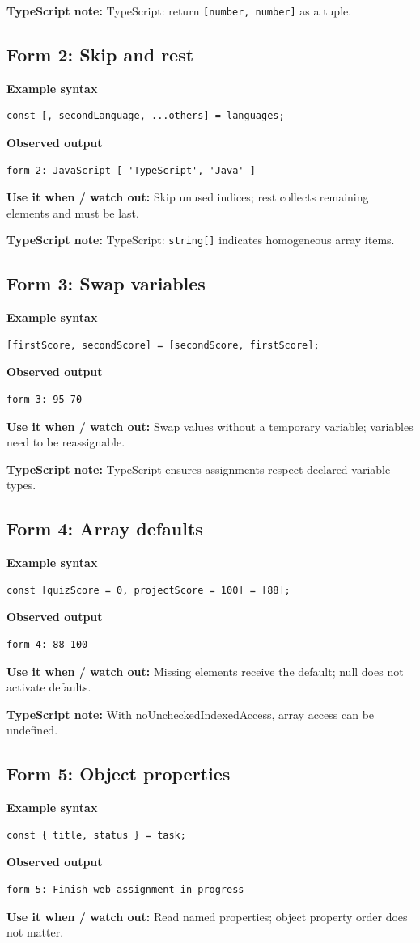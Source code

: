 \documentclass[11pt,a4paper]{article}
\begin{document}
\textbf{TypeScript note:} TypeScript: return \texttt{[number, number]} as a tuple.
\subsection{Form 2: Skip and rest}
\textbf{Example syntax}
\begin{lstlisting}
const [, secondLanguage, ...others] = languages;
\end{lstlisting}
\textbf{Observed output}
\begin{lstlisting}
form 2: JavaScript [ 'TypeScript', 'Java' ]
\end{lstlisting}
\textbf{Use it when / watch out:} Skip unused indices; rest collects remaining elements and must be last.

\textbf{TypeScript note:} TypeScript: \texttt{string[]} indicates homogeneous array items.
\subsection{Form 3: Swap variables}
\textbf{Example syntax}
\begin{lstlisting}
[firstScore, secondScore] = [secondScore, firstScore];
\end{lstlisting}
\textbf{Observed output}
\begin{lstlisting}
form 3: 95 70
\end{lstlisting}
\textbf{Use it when / watch out:} Swap values without a temporary variable; variables need to be reassignable.

\textbf{TypeScript note:} TypeScript ensures assignments respect declared variable types.
\subsection{Form 4: Array defaults}
\textbf{Example syntax}
\begin{lstlisting}
const [quizScore = 0, projectScore = 100] = [88];
\end{lstlisting}
\textbf{Observed output}
\begin{lstlisting}
form 4: 88 100
\end{lstlisting}
\textbf{Use it when / watch out:} Missing elements receive the default; null does not activate defaults.

\textbf{TypeScript note:} With noUncheckedIndexedAccess, array access can be undefined.
\subsection{Form 5: Object properties}
\textbf{Example syntax}
\begin{lstlisting}
const { title, status } = task;
\end{lstlisting}
\textbf{Observed output}
\begin{lstlisting}
form 5: Finish web assignment in-progress
\end{lstlisting}
\textbf{Use it when / watch out:} Read named properties; object property order does not matter.
\end{document}
